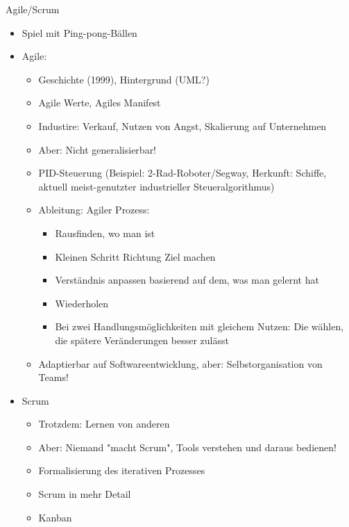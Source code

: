 \documentclass[aspectratio=169,t]{beamer}
\begin{document}
\begin{frame}[allowframebreaks]{Agile/Scrum}
    \begin{itemize}
        \item Spiel mit Ping-pong-Bällen
        \item Agile:
        \begin{itemize}
            \item Geschichte (1999), Hintergrund (UML?)
            \item Agile Werte, Agiles Manifest
            \item Industire: Verkauf, Nutzen von Angst, Skalierung auf Unternehmen
            \item Aber: Nicht generalisierbar!
            \item PID-Steuerung (Beispiel: 2-Rad-Roboter/Segway, Herkunft: Schiffe, aktuell meist-genutzter industrieller Steueralgorithmus)
            \item Ableitung: Agiler Prozess: 
            \begin{itemize}
                \item Rausfinden, wo man ist
                \item Kleinen Schritt Richtung Ziel machen
                \item Verständnis anpassen basierend auf dem, was man gelernt hat
                \item Wiederholen
                \item Bei zwei Handlungsmöglichkeiten mit gleichem Nutzen: Die wählen, die spätere Veränderungen besser zulässt
            \end{itemize}
            \item Adaptierbar auf Softwareentwicklung, aber: Selbstorganisation von Teams!
        \end{itemize}
        \item Scrum
        \begin{itemize}
            \item Trotzdem: Lernen von anderen
            \item Aber: Niemand "macht Scrum", Tools verstehen und daraus bedienen!
            \item Formalisierung des iterativen Prozesses
            \item Scrum in mehr Detail
            \item Kanban
        \end{itemize}
    \end{itemize}
\end{frame}
\end{document}

